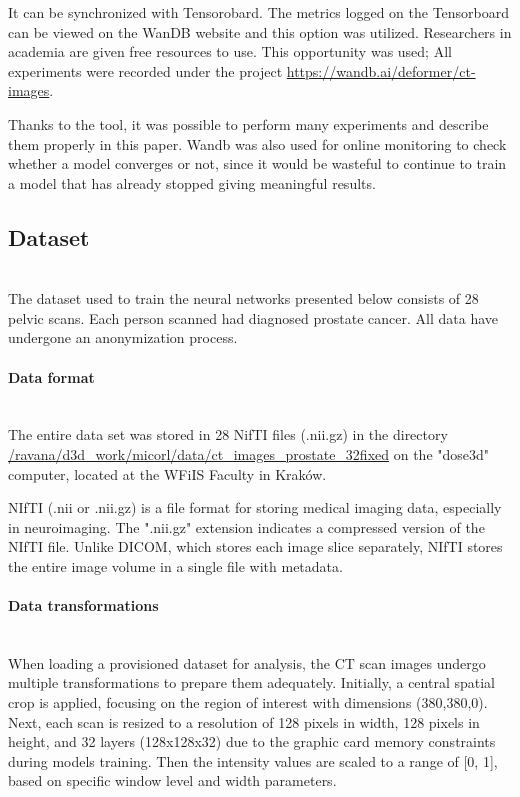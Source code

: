 It can be synchronized with Tensorobard. The metrics logged on the Tensorboard can be viewed on the WanDB website and this option was utilized. Researchers in academia are given free resources to use. This opportunity was used; All experiments were recorded under the project \url{https://wandb.ai/deformer/ct-images}.

Thanks to the tool, it was possible to perform many experiments and describe them properly in this paper. Wandb was also used for online monitoring to check whether a model converges or not, since it would be wasteful to continue to train a model that has already stopped giving meaningful results.
\newpage
\subsection{Dataset}\mbox{}\\
\indent The dataset used to train the neural networks presented below consists of 28 pelvic scans. Each person scanned had diagnosed prostate cancer. All data have undergone an anonymization process.
\paragraph{Data format}\mbox{}\\
\indent The entire data set was stored in 28 NifTI files (.nii.gz) in the directory \url{/ravana/d3d_work/micorl/data/ct_images_prostate_32fixed} on the "dose3d" computer, located at the WFiIS Faculty in Kraków.

NIfTI (.nii or .nii.gz) is a file format for storing medical imaging data, especially in neuroimaging. The ".nii.gz" extension indicates a compressed version of the NIfTI file. Unlike DICOM, which stores each image slice separately, NIfTI stores the entire image volume in a single file with metadata. 

\paragraph{Data transformations}\mbox{}\\
\indent When loading a provisioned dataset for analysis, the CT scan images undergo multiple transformations to prepare them adequately. Initially, a central spatial crop is applied, focusing on the region of interest with dimensions (380,380,0). Next, each scan is resized to a resolution of 128 pixels in width, 128 pixels in height, and 32 layers (128x128x32) due to the graphic card memory constraints during models training. Then the intensity values are scaled to a range of [0, 1], based on specific window level and width parameters. 

